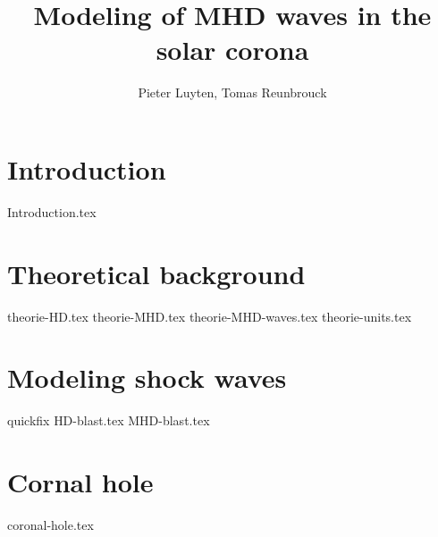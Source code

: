 \documentclass[a4paper]{article}
\title{Modeling of MHD waves in the solar corona}
\author{Pieter Luyten, Tomas Reunbrouck}
\begin{document}
\maketitle
\newpage
\tableofcontents
\newpage

\section{Introduction}
{Introduction.tex}


\section{Theoretical background}
{theorie-HD.tex}
{theorie-MHD.tex}
{theorie-MHD-waves.tex}
{theorie-units.tex}
\newpage

\section{Modeling shock waves}
quickfix
{HD-blast.tex}
{MHD-blast.tex}
\newpage

\section{Cornal hole}
{coronal-hole.tex}
\printbibliography
\end{document}
